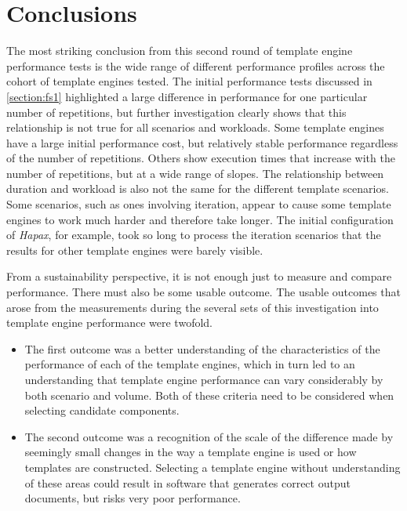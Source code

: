 \section{Conclusions}
\label{comp:conclusions}

The most striking conclusion from this second round of \gls{template engine} performance tests is the wide range of different performance profiles across the cohort of \gls{template engine}s tested. The initial performance tests discussed in \autoref{section:fs1} highlighted a large difference in performance for one particular number of repetitions, but further investigation clearly shows that this relationship is not true for all scenarios and workloads. Some \gls{template engine}s have a large initial performance cost, but relatively stable performance regardless of the number of repetitions. Others show execution times that increase with the number of repetitions, but at a wide range of slopes. The relationship between duration and workload is also not the same for the different template scenarios. Some scenarios, such as ones involving iteration, appear to cause some \gls{template engine}s to work much harder and therefore take longer. The initial configuration of \emph{Hapax}, for example, took so long to process the iteration scenarios that the results for other \gls{template engine}s were barely visible.

From a sustainability perspective, it is not enough just to measure and compare performance. There must also be some usable outcome. The usable outcomes that arose from the measurements during the several sets of this investigation into \gls{template engine} performance were twofold.

\label{A161}
\begin{itemize}
    \item The first outcome was a better understanding of the characteristics of the performance of each of the \gls{template engine}s, which in turn led to an understanding that \gls{template engine} performance can vary considerably by both scenario and volume. Both of these criteria need to be considered when selecting candidate components.
    \item The second outcome was a recognition of the scale of the difference made by seemingly small changes in the way a \gls{template engine} is used or how templates are constructed. Selecting a \gls{template engine} without understanding of these areas could result in software that generates correct output documents, but risks very poor performance. 
\end{itemize}

